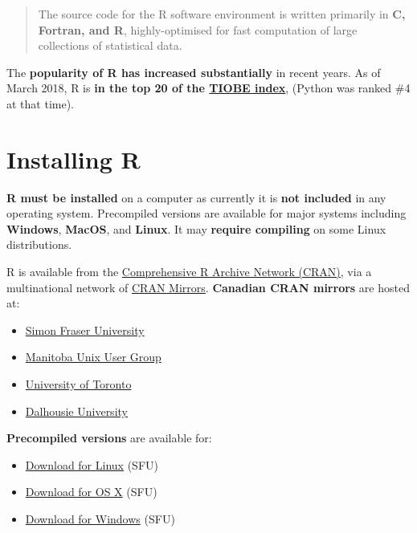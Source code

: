 \documentclass[]{book}
\providecommand{\tightlist}{%
  \setlength{\itemsep}{0pt}\setlength{\parskip}{0pt}}
\theoremstyle{definition}
\theoremstyle{definition}
\theoremstyle{definition}
\theoremstyle{remark}
\begin{document}
\begin{quote}
The source code for the R software environment is written primarily in
\textbf{C, Fortran, and R}, highly-optimised for fast computation of
large collections of statistical data.
\end{quote}

The \textbf{popularity of R has increased substantially} in recent
years. As of March 2018, R is \textbf{in the top 20 of the
\href{https://www.tiobe.com/tiobe-index/}{TIOBE index}}, (Python was
ranked \#4 at that time).

\hypertarget{installing-r}{%
\section{Installing R}\label{installing-r}}

\textbf{R must be installed} on a computer as currently it is
\textbf{not included} in any operating system. Precompiled versions are
available for major systems including \textbf{Windows}, \textbf{MacOS},
and \textbf{Linux}. It may \textbf{require compiling} on some Linux
distributions.

R is available from the \href{https://cran.r-project.org/}{Comprehensive
R Archive Network (CRAN)}, via a multinational network of
\href{https://cran.r-project.org/mirrors.html}{CRAN Mirrors}.
\textbf{Canadian CRAN mirrors} are hosted at:

\begin{itemize}
\tightlist
\item
  \href{http://cran.stat.sfu.ca/}{Simon Fraser University}
\item
  \href{http://muug.ca/mirror/cran/}{Manitoba Unix User Group}
\item
  \href{http://cran.utstat.utoronto.ca/}{University of Toronto}
\item
  \href{http://mirror.its.dal.ca/cran/}{Dalhousie University}
\end{itemize}

\textbf{Precompiled versions} are available for:

\begin{itemize}
\tightlist
\item
  \href{http://cran.stat.sfu.ca/bin/linux/}{Download for Linux} (SFU)
\item
  \href{http://cran.stat.sfu.ca/bin/macosx/}{Download for OS X} (SFU)
\item
  \href{http://cran.stat.sfu.ca/bin/windows/}{Download for Windows}
  (SFU)
\end{itemize}
\end{document}
